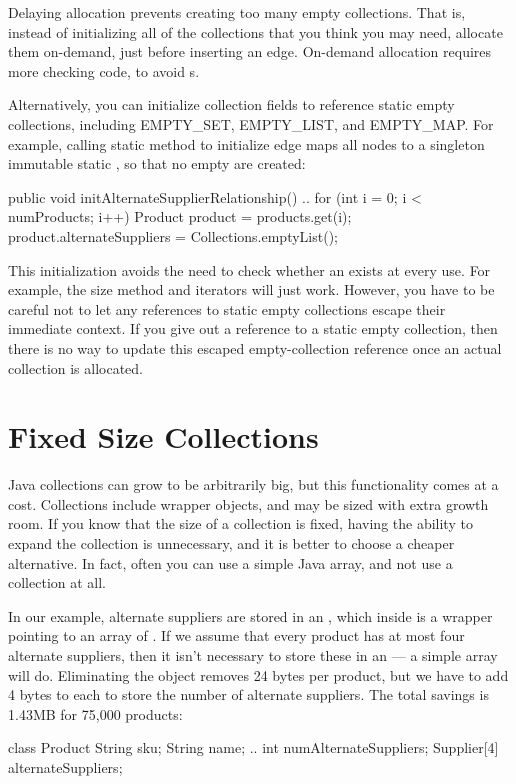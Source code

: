  Delaying allocation prevents creating too many empty collections.
 That is, instead of initializing all of the collections that you think you
 may need, allocate them on-demand, just before inserting an edge. On-demand
 allocation requires more checking code, to avoid s.
 
 Alternatively, you can initialize collection fields to reference static empty collections,
 including EMPTY\_SET,
 EMPTY\_LIST, and EMPTY\_MAP. For example, 
 calling static method  to initialize edge
  maps all nodes to a singleton immutable static
 , so that no empty  are created:
 \begin{shortlisting}
     public void initAlternateSupplierRelationship() {
       ..
       for (int i = 0; i < numProducts; i++) {
          Product product = products.get(i);
          product.alternateSuppliers = 
                               Collections.emptyList();
       }
     } 
 \end{shortlisting}
This initialization avoids the need to check whether an 
exists at every use. For example, the size method and iterators will just work.
However, you have to be careful not to let any references to static empty
collections escape their immediate context. 
If you give out a reference to a static empty collection, 
then there is no way to update this escaped empty-collection reference
once an actual collection is allocated. 

\section{Fixed Size Collections}

Java collections can grow to be
arbitrarily big, but this functionality comes at a cost.
Collections include wrapper objects, and 
may be sized with extra growth room. If
you know that the size of a collection is fixed, having the ability to expand
the collection is unnecessary, and it is better to choose a cheaper alternative.
In fact, often you can use a
simple Java array, and not use a collection at all.  

In our example, alternate suppliers are stored in an
 , which inside is a
wrapper pointing to an array of .  If we assume that
every product has at most four alternate suppliers, then  it isn't 
necessary to store these in an  --- a simple array will do.
Eliminating the  object removes 24 bytes per
product, but we have to add 4 bytes to each  to store the number
of alternate suppliers. The total savings is 1.43MB for 75,000 products:
\begin{shortlisting} 
class Product {
	String sku;
	String name;
	.. 
	int numAlternateSuppliers;
	Supplier[4] alternateSuppliers;
}
\end{shortlisting}
 

